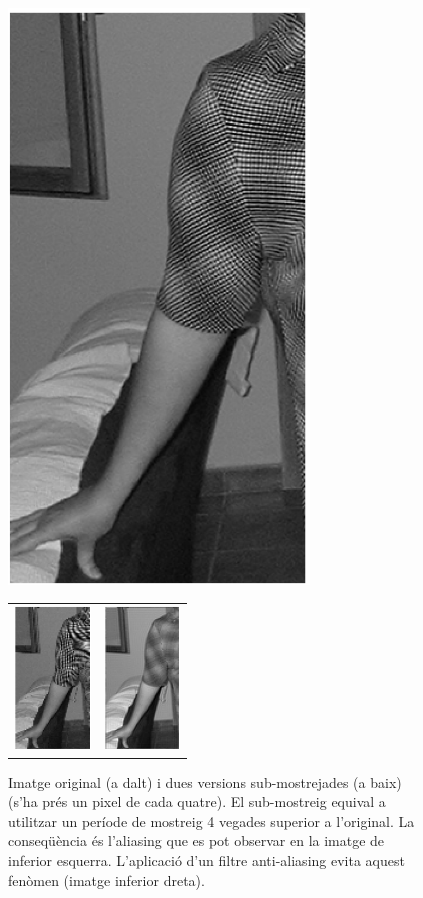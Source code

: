 \documentclass{article}
\begin{document}
\begin{figure}[htbp]
\begin{center}
\includegraphics[width=8cm]{imatges/camisa.eps}\\
\begin{tabular}{cc}
\includegraphics[width=2cm]{imatges/camisaIZ4.eps} &
\includegraphics[width=2cm]{imatges/camisaFIZ4.eps}
\end{tabular}
\caption{Imatge original (a dalt) i dues versions sub-mostrejades (a baix) 
(s'ha pr\'es un pixel de cada quatre). El sub-mostreig equival a utilitzar un per\'iode 
de mostreig 4 vegades superior a l'original. La conseq\"u\`encia \'es l'aliasing
que es pot observar en la imatge de inferior esquerra. L'aplicaci\'o d'un filtre
anti-aliasing evita aquest fen\`omen (imatge inferior dreta).}
\label{figaliasing}
\end{center}
\end{figure}
\end{document}

